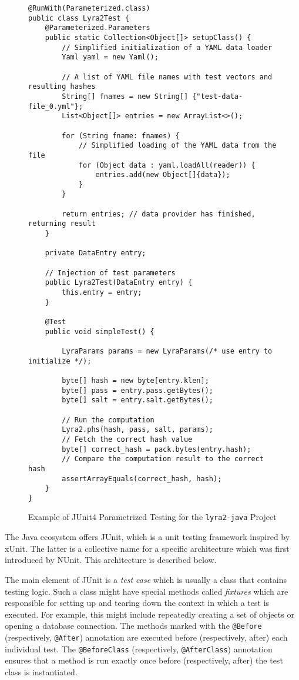 \begin{figure}
\small
\begin{verbatim}
@RunWith(Parameterized.class)
public class Lyra2Test {
    @Parameterized.Parameters
    public static Collection<Object[]> setupClass() {
        // Simplified initialization of a YAML data loader
        Yaml yaml = new Yaml();

        // A list of YAML file names with test vectors and resulting hashes
        String[] fnames = new String[] {"test-data-file_0.yml"};
        List<Object[]> entries = new ArrayList<>();

        for (String fname: fnames) {
            // Simplified loading of the YAML data from the file
            for (Object data : yaml.loadAll(reader)) {
                entries.add(new Object[]{data});
            }
        }

        return entries; // data provider has finished, returning result
    }

    private DataEntry entry;

    // Injection of test parameters
    public Lyra2Test(DataEntry entry) {
        this.entry = entry;
    }

    @Test
    public void simpleTest() {

        LyraParams params = new LyraParams(/* use entry to initialize */);

        byte[] hash = new byte[entry.klen];
        byte[] pass = entry.pass.getBytes();
        byte[] salt = entry.salt.getBytes();

        // Run the computation
        Lyra2.phs(hash, pass, salt, params);
        // Fetch the correct hash value
        byte[] correct_hash = pack.bytes(entry.hash);
        // Compare the computation result to the correct hash
        assertArrayEquals(correct_hash, hash);
    }
}
\end{verbatim}
\normalsize
\caption{Example of JUnit4 Parametrized Testing for the \texttt{lyra2-java} Project}
\label{fig:junit4-parametrization}
\end{figure}

The Java ecosystem offers JUnit, which is a unit testing framework inspired by xUnit. The latter is a collective name for a specific architecture which was first introduced by NUnit. This architecture is described below.

The main element of JUnit is a \emph{test case} which is usually a class that contains testing logic. Such a class might have special methods called \emph{fixtures} which are responsible for setting up and tearing down the context in which a test is executed. For example, this might include repeatedly creating a set of objects or opening a database connection. The methods marked with the \texttt{@Before} (respectively, \texttt{@After}) annotation are executed before (respectively, after) each individual test. The \texttt{@BeforeClass} (respectively, \texttt{@AfterClass}) annotation ensures that a method is run exactly once before (respectively, after) the test class is instantiated.

